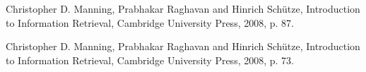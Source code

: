 \cleardoublepage
{}
{}
\begin{thebibliography}{99}

    Christopher D. Manning, Prabhakar Raghavan and Hinrich Schütze, Introduction to Information Retrieval, Cambridge University Press, 2008, p. 87.

    Christopher D. Manning, Prabhakar Raghavan and Hinrich Schütze, Introduction to Information Retrieval, Cambridge University Press, 2008, p. 73.

\end{thebibliography}